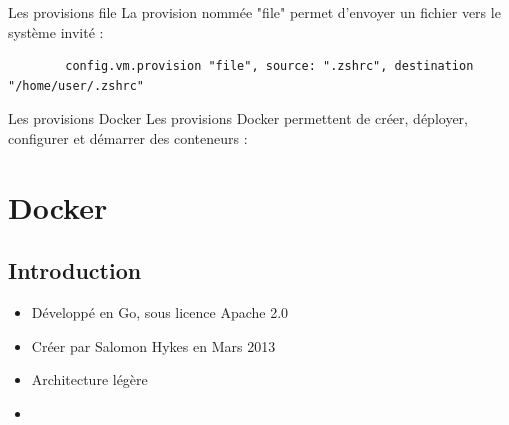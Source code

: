 \documentclass{beamer}
\begin{document}
    \begin{frame}[containsverbatim]{Les provisions file}
        La provision nommée "file" permet d'envoyer un fichier vers le système invité :
        \begin{verbatim}
        config.vm.provision "file", source: ".zshrc", destination "/home/user/.zshrc"
        \end{verbatim}
    \end{frame}

    \begin{frame}[containsverbatim]{Les provisions Docker}
        Les provisions Docker permettent de créer, déployer, configurer et démarrer des conteneurs : 
    \end{frame}
    
    
    
    
    
    
    
    
    
    
    
    
    
    
    
    
    
    
    
    
    
    
    
    
    
    
    
    
    
    
    
    
    
    
    
    
    
    
    
    
    
    \section{Docker}
    \subsection{Introduction}
    \begin{frame}
       \begin{itemize}
          \item{Développé en Go, sous licence Apache 2.0}
          \item{Créer par Salomon Hykes en Mars 2013}
          \item{Architecture légère}
          \item{}
       \end{itemize}
    \end{frame}
\end{document}
